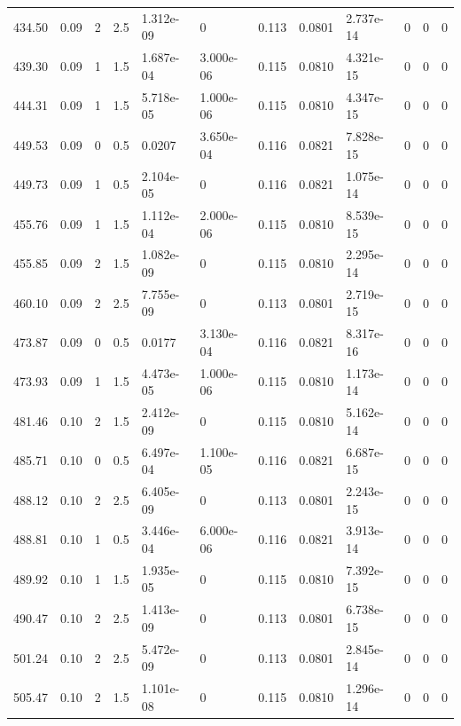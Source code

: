 \documentclass[preview]{standalone}
\begin{document}
{{{\begin{tabular}{L{1.2cm}C{1.2cm} C{0.3cm}C{0.5cm} C{1.4cm}C{1.4cm} C{1.4cm}C{1.4cm} C{1.6cm}C{1.6cm} C{1.6cm}C{1.6cm}}
  434.50  &  0.09  & 2     & 2.5 &  1.312e-09  & 0  &  0.113&   0.0801& 2.737e-14 & 0   &  0 & 0  \\ 
  439.30  &  0.09  & 1     & 1.5 &  1.687e-04  & 3.000e-06  &  0.115&   0.0810& 4.321e-15 & 0   &  0 & 0  \\ 
  444.31  &  0.09  & 1     & 1.5 &  5.718e-05  & 1.000e-06  &  0.115&   0.0810& 4.347e-15 & 0   &  0 & 0  \\ 
  449.53  &  0.09  & 0     & 0.5 &  0.0207  & 3.650e-04  &  0.116&   0.0821& 7.828e-15 & 0   &  0 & 0  \\ 
  449.73  &  0.09  & 1     & 0.5 &  2.104e-05  & 0  &  0.116&   0.0821& 1.075e-14 & 0   &  0 & 0  \\ 
  455.76  &  0.09  & 1     & 1.5 &  1.112e-04  & 2.000e-06  &  0.115&   0.0810& 8.539e-15 & 0   &  0 & 0  \\ 
  455.85  &  0.09  & 2     & 1.5 &  1.082e-09  & 0  &  0.115&   0.0810& 2.295e-14 & 0   &  0 & 0  \\ 
  460.10  &  0.09  & 2     & 2.5 &  7.755e-09  & 0  &  0.113&   0.0801& 2.719e-15 & 0   &  0 & 0  \\ 
  473.87  &  0.09  & 0     & 0.5 &  0.0177  & 3.130e-04  &  0.116&   0.0821& 8.317e-16 & 0   &  0 & 0  \\ 
  473.93  &  0.09  & 1     & 1.5 &  4.473e-05  & 1.000e-06  &  0.115&   0.0810& 1.173e-14 & 0   &  0 & 0  \\ 
  481.46  &  0.10  & 2     & 1.5 &  2.412e-09  & 0  &  0.115&   0.0810& 5.162e-14 & 0   &  0 & 0  \\ 
  485.71  &  0.10  & 0     & 0.5 &  6.497e-04  & 1.100e-05  &  0.116&   0.0821& 6.687e-15 & 0   &  0 & 0  \\ 
  488.12  &  0.10  & 2     & 2.5 &  6.405e-09  & 0  &  0.113&   0.0801& 2.243e-15 & 0   &  0 & 0  \\ 
  488.81  &  0.10  & 1     & 0.5 &  3.446e-04  & 6.000e-06  &  0.116&   0.0821& 3.913e-14 & 0   &  0 & 0  \\ 
  489.92  &  0.10  & 1     & 1.5 &  1.935e-05  & 0  &  0.115&   0.0810& 7.392e-15 & 0   &  0 & 0  \\ 
  490.47  &  0.10  & 2     & 2.5 &  1.413e-09  & 0  &  0.113&   0.0801& 6.738e-15 & 0   &  0 & 0  \\ 
  501.24  &  0.10  & 2     & 2.5 &  5.472e-09  & 0  &  0.113&   0.0801& 2.845e-14 & 0   &  0 & 0  \\ 
  505.47  &  0.10  & 2     & 1.5 &  1.101e-08  & 0  &  0.115&   0.0810& 1.296e-14 & 0   &  0 & 0  \\ 

\end{tabular}}}}
\end{document}
